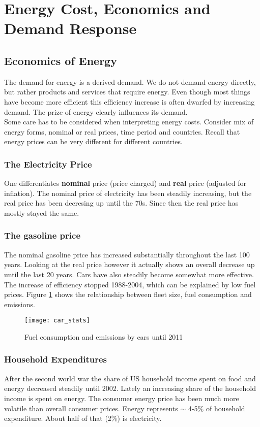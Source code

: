 \section{Energy Cost, Economics and Demand Response}

\subsection{Economics of Energy}
The demand for energy is a derived demand.
We do not demand energy directly, but rather products and services that require energy.
Even though most things have become more efficient this efficiency increase is often dwarfed by increasing demand.
The prize of energy clearly influences its demand.\\

Some care has to be considered when interpreting energy costs.
Consider mix of energy forms, nominal or real prices, time period and countries.
Recall that energy prices can be very different for different countries.

\subsubsection{The Electricity Price}
One differentiates \textbf{nominal} price (price charged) and \textbf{real} price (adjusted for inflation).
The nominal price of electricity has been steadily increasing, but the real price has been decresing up until the 70s.
Since then the real price has mostly stayed the same.

\subsubsection{The gasoline price}
The nominal gasoline price has increased substantially throughout the last 100 years.
Looking at the real price however it actually shows an overall decrease up until the last 20 years.
Cars have also steadily become somewhat more effective.
The increase of efficiency stopped 1988-2004, which can be explained by low fuel prices.
Figure \ref{fig:car_stats} shows the relationship between fleet size, fuel consumption and \cotwo emissions.

\begin{figure}
    \centering
    \texttt{[image: car\_stats]}
    \caption{Fuel consumption and \cotwo emissions by cars until 2011}
    \label{fig:car_stats}
\end{figure}

\subsubsection{Household Expenditures}
After the second world war the share of US household income spent on food and energy decreased steadily until 2002.
Lately an increasing share of the household income is spent on energy.
The consumer energy price has been much more volatile than overall consumer prices.
Energy represents $\sim$ 4-5\% of household expenditure.
About half of that (2\%) is electricity.

